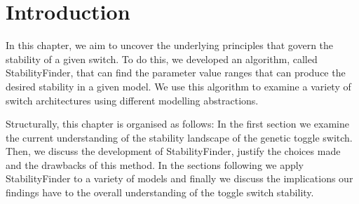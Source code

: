 \section{Introduction}

In this chapter, we aim to uncover the underlying principles that govern the stability of a given switch. To do this, we developed an algorithm, called StabilityFinder, that can find the parameter value ranges that can produce the desired stability in a given model. We use this algorithm to examine a variety of switch architectures using different modelling abstractions.

Structurally, this chapter is organised as follows: In the first section we examine the current understanding of the stability landscape of the genetic toggle switch. Then, we discuss the development of StabilityFinder, justify the choices made and the drawbacks of this method. In the sections following we apply StabilityFinder to a variety of models and finally we discuss the implications our findings have to the overall understanding of the toggle switch stability. 

